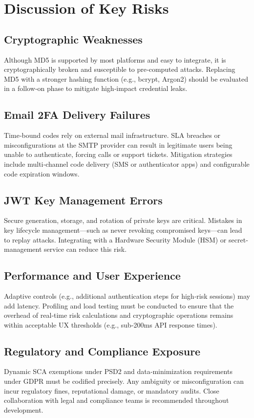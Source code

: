 \section{Discussion of Key Risks}

\subsection{Cryptographic Weaknesses}
Although MD5 is supported by most platforms and easy to integrate, it is cryptographically broken and susceptible to pre‐computed attacks. Replacing MD5 with a stronger hashing function (e.g., bcrypt, Argon2) should be evaluated in a follow‐on phase to mitigate high‐impact credential leaks.

\subsection{Email 2FA Delivery Failures}
Time‐bound codes rely on external mail infrastructure. SLA breaches or misconfigurations at the SMTP provider can result in legitimate users being unable to authenticate, forcing calls or support tickets. Mitigation strategies include multi‐channel code delivery (SMS or authenticator apps) and configurable code expiration windows.

\subsection{JWT Key Management Errors}
Secure generation, storage, and rotation of private keys are critical. Mistakes in key lifecycle management—such as never revoking compromised keys—can lead to replay attacks. Integrating with a Hardware Security Module (HSM) or secret‐management service can reduce this risk.

\subsection{Performance and User Experience}
Adaptive controls (e.g., additional authentication steps for high‐risk sessions) may add latency. Profiling and load testing must be conducted to ensure that the overhead of real‐time risk calculations and cryptographic operations remains within acceptable UX thresholds (e.g., sub‐200ms API response times).

\subsection{Regulatory and Compliance Exposure}
Dynamic SCA exemptions under PSD2 and data‐minimization requirements under GDPR must be codified precisely. Any ambiguity or misconfiguration can incur regulatory fines, reputational damage, or mandatory audits. Close collaboration with legal and compliance teams is recommended throughout development.

